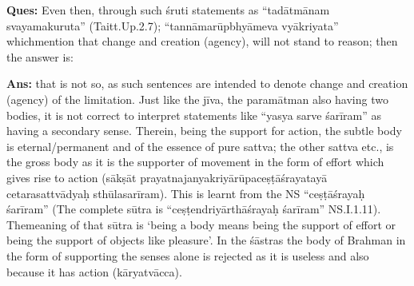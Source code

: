 \textbf{Ques:} Even then, through such śruti statements as “tadātmānam svayamakuruta” (Taitt.Up.2.7); “tannāmarūpbhyāmeva vyākriyata” which\break mention that change and creation (agency), will not stand to reason; then the answer is:

\textbf{Ans:} that is not so, as such sentences are intended to denote change and creation (agency) of the limitation. Just like the jīva, the paramātman also having two bodies, it is not correct to interpret statements like “yasya sarve śarīram” as having a secondary sense. Therein, being the support for action, the subtle body is eternal/permanent and of the essence of pure sattva; the other sattva etc., is the gross body as it is the supporter of movement in the form of effort which gives rise to action (sākṣāt prayatnajanyakriyārūpaceṣṭāśrayatayā cetarasattvādyaḥ sthūlasarīram). This is learnt from the NS “ceṣṭāśrayaḥ śarīram” (The complete sūtra is “ceṣṭendriyārthāśrayaḥ śarīram” NS.I.1.11). The\break meaning of that sūtra is ‘being a body means being the support of effort or being the support of objects like pleasure’. In the śāstras the body of Brahman in the form of supporting the senses alone is rejected as it is useless and also because it has action (kāryatvācca).

